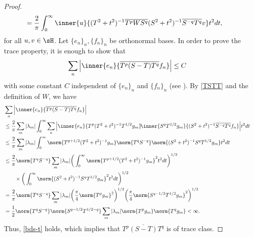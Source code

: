 \documentclass[12pt,draft]{article}
\theoremstyle{plain}
\numberwithin{equation}{section}
\theoremstyle{remark}
\begin{document}
\begin{proof}
\begin{align}
& = \frac{2}{\pi} \int_0^\infty \inner{u}{(T^2+t^2)^{-1} \overline{T^{p} W S^{q}} (S^2+t^2)^{-1} \overline{S^{-q}T^q}v} t^2dt,\label{TSTT}
\end{align}
for all $u,v\in\sH$.
Let $\{e_n\}_n, \{f_n\}_n$ be orthonormal bases. In order to prove 
the trace property, it is enough to show that 
\begin{align}
  \sum_{n} \Big| \inner{e_n}{\overline{T^p(S-T)T^q}f_n} \Big| \leq C \label{bds-t}
\end{align}
with some constant $C$ independent of $\{e_n\}_n$ and $\{f_n\}_n$ (see \cite[Proposition 3.6.5]{Si15}).
By \eqref{TSTT} and the definition of $W$, we have
\begin{align*}
& \sum_{n} \Big| \inner{e_n}{\overline{T^p(S-T)T^q}f_n} \Big| \\
&\leq \frac{2}{\pi} \sum_{m} | \lambda_m | \int_0^\infty  \sum_{n} \Big| \inner{e_n}{T^p(T^2+t^2)^{-1}T^{1/2}g_m} \! \inner{S^qT^{1/2}g_m}{(S^2+t^2)^{-1}\overline{S^{-q}T^q}f_n} \Big| t^2 dt \\
&\leq \frac{2}{\pi} \sum_{m} | \lambda_m | \int_0^\infty \norm{T^{p+1/2}(T^2+t^2)^{-1} g_m} \norm{T^qS^{-q}} \norm{(S^2+t^2)^{-1}S^qT^{1/2}g_m} t^2 dt \\
&\leq \frac{2}{\pi} \norm{T^qS^{-q}} \sum_{m} | \lambda_m | \bigg( \int_0^\infty  \norm{T^{p+1/2}(T^2+t^2)^{-1} g_m}^2 t^2dt \bigg)^{1/2} \\
&\qquad \times      \bigg( \int_0^\infty \norm{(S^2+t^2)^{-1}S^q T^{1/2}g_m}^2 t^2 dt  \bigg)^{1/2} \\
&= \frac{2}{\pi} \norm{T^qS^{-q}} \sum_{m} | \lambda_m | \bigg( \frac{\pi}{4}\norm{T^pg_m}^2  \bigg)^{1/2} \bigg( \frac{\pi}{4} \norm{S^{q-1/2}T^{1/2}g_m}^2 \bigg)^{1/2} \\
&= \frac{1}{2} \norm{T^qS^{-q}} \norm{S^{q-1/2}T^{1/2-q}} \sum_{m} | \lambda_m | \norm{T^pg_m} \norm{T^qg_m}  < \infty.
\end{align*}
Thus, \eqref{bds-t} holds, which implies that $\overline{T^p(S-T)T^q}$ is of trace class.
\end{proof}
\end{document}
